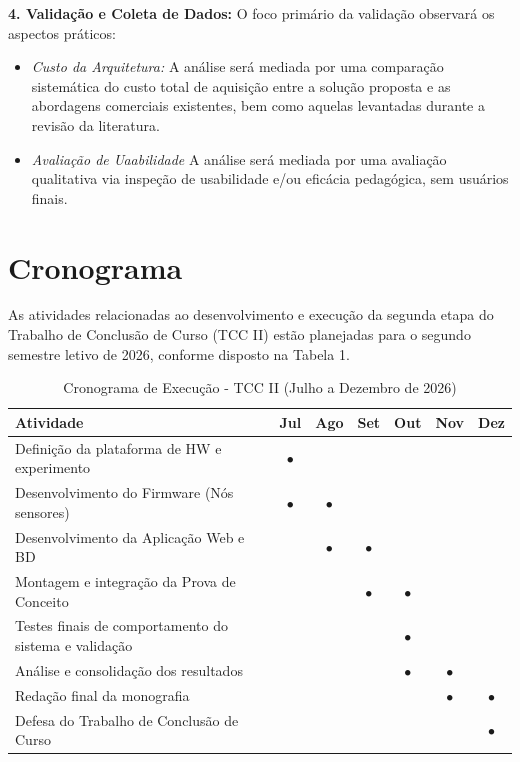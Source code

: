 \documentclass[12pt,a4paper]{article}
\begin{document}
\textbf{4. Validação e Coleta de Dados:} O foco primário da validação observará os aspectos práticos:
\begin{itemize}
    \item \textit{Custo da Arquitetura:} A análise será mediada por uma comparação sistemática do custo total de aquisição entre a solução proposta e as abordagens comerciais existentes, bem como aquelas levantadas durante a revisão da literatura.
    \item \textit{Avaliação de Uaabilidade} A análise será mediada por uma avaliação qualitativa via inspeção de usabilidade e/ou eficácia pedagógica, sem usuários finais.
\end{itemize}

\section{Cronograma}

As atividades relacionadas ao desenvolvimento e execução da segunda etapa do Trabalho de Conclusão de Curso (TCC II) estão planejadas para o segundo semestre letivo de 2026, conforme disposto na Tabela 1.

\begin{table}[h]
\centering
\caption{Cronograma de Execução - TCC II (Julho a Dezembro de 2026)}
\vspace{0.3cm}
\begin{tabular}{lcccccc}
\toprule
\textbf{Atividade} & \textbf{Jul} & \textbf{Ago} & \textbf{Set} & \textbf{Out} & \textbf{Nov} & \textbf{Dez} \\
\midrule
Definição da plataforma de HW e experimento & $\bullet$ & & & & & \\
Desenvolvimento do Firmware (Nós sensores) & $\bullet$ & $\bullet$ & & & & \\
Desenvolvimento da Aplicação Web e BD      & & $\bullet$ & $\bullet$ & & & \\
Montagem e integração da Prova de Conceito & & & $\bullet$ & $\bullet$ & & \\
Testes finais de comportamento do sistema e validação & & & & $\bullet$ & & \\
Análise e consolidação dos resultados      & & & & $\bullet$ & $\bullet$ & \\
Redação final da monografia                & & & & & $\bullet$ & $\bullet$ \\
Defesa do Trabalho de Conclusão de Curso   & & & & & & $\bullet$ \\
\bottomrule
\end{tabular}
\end{table}
\end{document}

